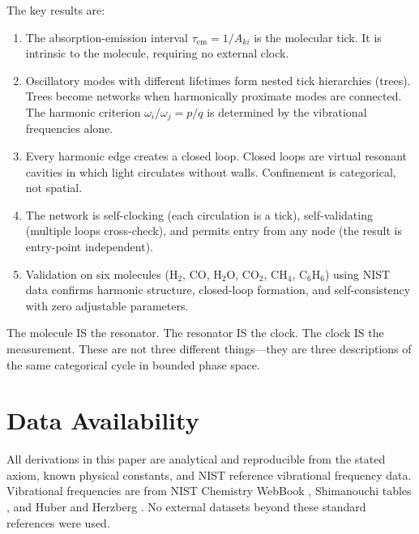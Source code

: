 \documentclass[11pt,a4paper]{article}
\theoremstyle{definition}
\theoremstyle{remark}
\newcommand{\tem}{\tau_{\mathrm{em}}}
\newcommand{\Aki}{A_{ki}}
\begin{document}
The key results are:
\begin{enumerate}
\item The absorption-emission interval $\tem = 1/\Aki$ is the molecular tick. It is intrinsic to the molecule, requiring no external clock.

\item Oscillatory modes with different lifetimes form nested tick hierarchies (trees). Trees become networks when harmonically proximate modes are connected. The harmonic criterion $\omega_i/\omega_j = p/q$ is determined by the vibrational frequencies alone.

\item Every harmonic edge creates a closed loop. Closed loops are virtual resonant cavities in which light circulates without walls. Confinement is categorical, not spatial.

\item The network is self-clocking (each circulation is a tick), self-validating (multiple loops cross-check), and permits entry from any node (the result is entry-point independent).

\item Validation on six molecules (H$_2$, CO, H$_2$O, CO$_2$, CH$_4$, C$_6$H$_6$) using NIST data confirms harmonic structure, closed-loop formation, and self-consistency with zero adjustable parameters.
\end{enumerate}

The molecule IS the resonator. The resonator IS the clock. The clock IS the measurement. These are not three different things---they are three descriptions of the same categorical cycle in bounded phase space.

\section*{Data Availability}

All derivations in this paper are analytical and reproducible from the stated axiom, known physical constants, and NIST reference vibrational frequency data. Vibrational frequencies are from NIST Chemistry WebBook \citep{nist_webbook}, Shimanouchi tables \citep{shimanouchi1972}, and Huber and Herzberg \citep{huber1979}. No external datasets beyond these standard references were used.



\end{document}

